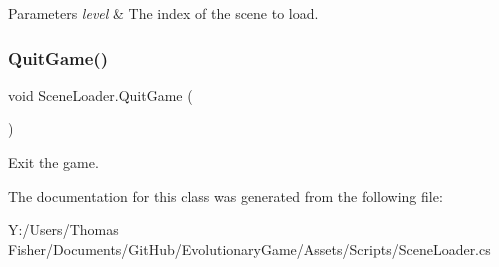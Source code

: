 \begin{DoxyParams}{Parameters}
{\em level} & The index of the scene to load.\\
\hline
\end{DoxyParams}
\mbox{\label{class_scene_loader_a6e71b5a31f735d3187e8375383bdfe5d}} 
\subsubsection{\texorpdfstring{Quit\+Game()}{QuitGame()}}
{\footnotesize\ttfamily void Scene\+Loader.\+Quit\+Game (\begin{DoxyParamCaption}{ }\end{DoxyParamCaption})}



Exit the game. 



The documentation for this class was generated from the following file\+:\begin{DoxyCompactItemize}
\item 
Y\+:/\+Users/\+Thomas Fisher/\+Documents/\+Git\+Hub/\+Evolutionary\+Game/\+Assets/\+Scripts/Scene\+Loader.\+cs\end{DoxyCompactItemize}
